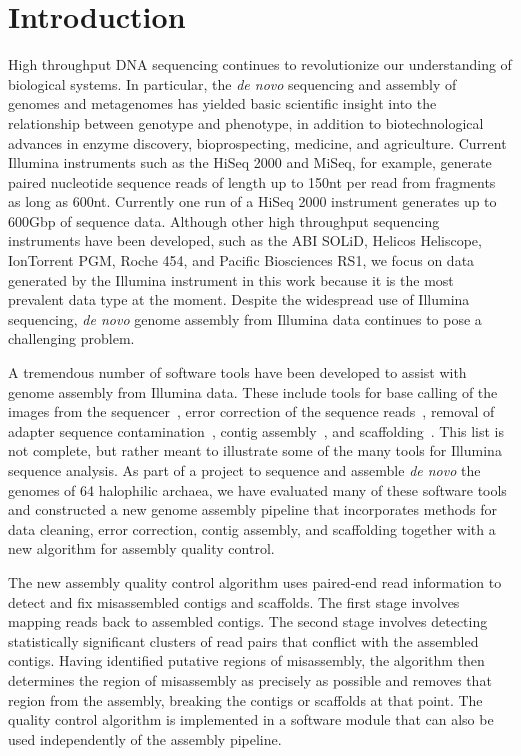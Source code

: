 \documentclass{bioinfo}
\begin{document}
\section{Introduction}
High throughput DNA sequencing continues to revolutionize our understanding of biological systems. In particular,
the \textit{de novo} sequencing and assembly of genomes and metagenomes has yielded basic scientific insight into 
the relationship between genotype and phenotype,
in addition to biotechnological advances in enzyme discovery, bioprospecting, medicine, and agriculture.  
Current Illumina instruments such as the HiSeq 2000 and MiSeq, for example, generate paired nucleotide 
sequence reads of length up to 150nt per read from fragments as long as 600nt.  Currently one run of a HiSeq 2000 instrument
generates up to 600Gbp of sequence data. Although other high throughput sequencing instruments 
have been developed, such as the ABI SOLiD, Helicos Heliscope, IonTorrent PGM, Roche 454, and Pacific Biosciences RS1, we focus
on data generated by the Illumina instrument in this work because it is the most prevalent data type at the moment.
Despite the widespread use of Illumina sequencing,
\emph{de novo} genome assembly from Illumina data continues to pose a 
challenging problem.

A tremendous number of software tools have been developed to assist with genome assembly from Illumina data.
These include tools for base calling of the images from the sequencer~\citep{BayesCall,Kircher2009},
error correction of the sequence reads~\citep{Kelley2010,Kao2011}, removal of adapter sequence contamination~\citep{Lassmann2009},
contig assembly~\citep{Warren2007,Chaisson2008}, and scaffolding~\citep{Koren2011,Boetzer2011,Dayarian2010}.
This list is not complete, but rather meant to illustrate some of the many tools for Illumina sequence analysis.
As part of a project to sequence and assemble \textit{de novo} the genomes of 64 halophilic archaea, we have
evaluated many of these software tools and constructed a new genome assembly pipeline that incorporates
methods for data cleaning, error correction, contig assembly, and scaffolding together with a new algorithm
for assembly quality control. 

The new assembly quality control algorithm uses paired-end read information
to detect and fix misassembled contigs and scaffolds. The first stage involves mapping reads back to assembled contigs.
The second stage involves detecting statistically significant clusters of read pairs that conflict with the
assembled contigs. Having identified putative regions of misassembly, the algorithm then determines the 
region of misassembly as precisely as possible and removes that region from the assembly, breaking the contigs
or scaffolds at that point. The quality control algorithm is implemented in a software module that can also be used 
independently of the assembly pipeline.
\end{document}
